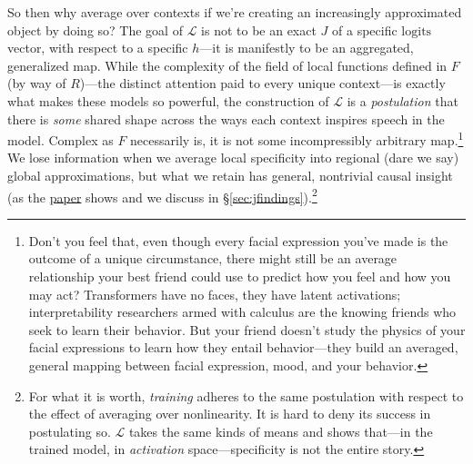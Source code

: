\documentclass{article}
\newcommand{\logits}{\mathrm{logits}}
\newcommand{\jlens}{\mathscr{L}}
\begin{document}
So then why average over contexts if we're creating an increasingly approximated object by doing so? The goal of \(\jlens\) is not to be an exact \(J\) of a specific \(\logits\) vector, with respect to a specific \(h\)---it is manifestly to be an aggregated, generalized map. While the complexity of the field of local functions defined in \(F\) (by way of \(R\))---the distinct attention paid to every unique context---is exactly what makes these models so powerful, the construction of \(\jlens\) is a \textit{postulation} that there is \textit{some} shared shape across the ways each context inspires speech in the model. Complex as \(F\) necessarily is, it is not some incompressibly arbitrary map.\footnote{Don't you feel that, even though every facial expression you've made is the outcome of a unique circumstance, there might still be an average relationship your best friend could use to predict how you feel and how you may act? Transformers have no faces, they have latent activations; interpretability researchers armed with calculus are the knowing friends who seek to learn their behavior. But your friend doesn't study the physics of your facial expressions to learn how they entail behavior---they build an averaged, general mapping between facial expression, mood, and your behavior.} We lose information when we average local specificity into regional (dare we say) global approximations, but what we retain has general, nontrivial causal insight (as the \href{https://transformer-circuits.pub/2026/workspace/index.html}{paper} shows and we discuss in \S\ref{sec:jfindings}).\footnote{For what it is worth, \textit{training} adheres to the same postulation with respect to the effect of averaging over nonlinearity. It is hard to deny its success in postulating so. \(\jlens\) takes the same kinds of means and shows that---in the trained model, in \textit{activation} space---specificity is not the entire story.}
\end{document}
